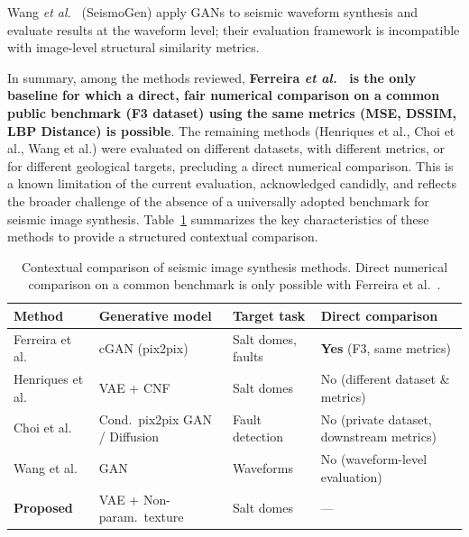 \documentclass{ieeeaccess}
\begin{document}
Wang \emph{et al.}~\cite{Wang2021} (SeismoGen) apply GANs to seismic waveform synthesis and evaluate results at the waveform level; their evaluation framework is incompatible with image-level structural similarity metrics.

In summary, among the methods reviewed, \textbf{Ferreira \emph{et al.}~\cite{Ferreira2020} is the only baseline for which a direct, fair numerical comparison on a common public benchmark (F3 dataset) using the same metrics (MSE, DSSIM, LBP Distance) is possible}. The remaining methods (Henriques et al., Choi et al., Wang et al.) were evaluated on different datasets, with different metrics, or for different geological targets, precluding a direct numerical comparison. This is a known limitation of the current evaluation, acknowledged candidly, and reflects the broader challenge of the absence of a universally adopted benchmark for seismic image synthesis. Table~\ref{tab:comparison_overview} summarizes the key characteristics of these methods to provide a structured contextual comparison.

\begin{table}[htbp]
    \centering
    \caption{Contextual comparison of seismic image synthesis methods. Direct numerical comparison on a common benchmark is only possible with Ferreira et al.~\cite{Ferreira2020}.}
    \label{tab:comparison_overview}
    \footnotesize
    \begin{tabular}{p{2.0cm}p{1.5cm}p{1.6cm}p{1.5cm}}
        \toprule
        \textbf{Method} & \textbf{Generative model} & \textbf{Target task} & \textbf{Direct comparison} \\
        \midrule
        Ferreira et al.~\cite{Ferreira2020} & cGAN (pix2pix) & Salt domes, faults & \textbf{Yes} (F3, same metrics) \\
        Henriques et al.~\cite{Henriques2021} & VAE + CNF & Salt domes & No (different dataset \& metrics) \\
        Choi et al.~\cite{Choi2025} & Cond.\ pix2pix GAN / Diffusion & Fault detection & No (private dataset, downstream metrics) \\
        Wang et al.~\cite{Wang2021} & GAN & Waveforms & No (waveform-level evaluation) \\
        \midrule
        \textbf{Proposed} & VAE + Non-param.\ texture & Salt domes & --- \\
        \bottomrule
    \end{tabular}
\end{table}
\end{document}
